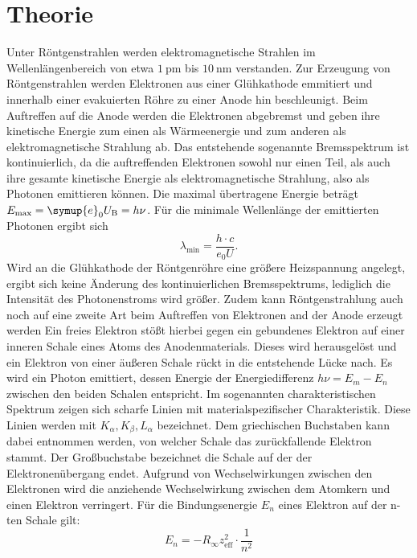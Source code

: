 \section{Theorie}
\label{sec:Theorie}
Unter Röntgenstrahlen werden elektromagnetische Strahlen im Wellenlängenbereich von etwa $\SI{1}{\pico\meter}$ bis $\SI{10}{\nano\meter}$ verstanden.
Zur Erzeugung von Röntgenstrahlen werden Elektronen aus einer Glühkathode emmitiert und innerhalb einer evakuierten Röhre zu einer Anode hin beschleunigt.
Beim Auftreffen auf die Anode werden die Elektronen abgebremst und geben ihre kinetische Energie zum einen als Wärmeenergie und zum anderen als elektromagnetische Strahlung ab.
Das entstehende sogenannte Bremsspektrum ist kontinuierlich, da die auftreffenden Elektronen sowohl nur einen Teil, als auch ihre gesamte kinetische Energie als elektromagnetische Strahlung, also als Photonen emittieren können.
Die maximal übertragene Energie beträgt $E_\mathrm{max}=\symup{e}_0U_\mathrm{B}=h\nu$.
Für die minimale Wellenlänge der emittierten Photonen ergibt sich
\begin{equation}
  \label{eqn:welle}
  \lambda_\mathrm{min}=\frac{h\cdot c}{e_0U} \text{.}
\end{equation}
Wird an die Glühkathode der Röntgenröhre eine größere Heizspannung angelegt, ergibt sich keine Änderung des kontinuierlichen Bremsspektrums, lediglich die Intensität des Photonenstroms wird größer.
Zudem kann Röntgenstrahlung auch noch auf eine zweite Art beim Auftreffen von Elektronen and der Anode erzeugt werden
Ein freies Elektron stößt hierbei gegen ein gebundenes Elektron auf einer inneren Schale eines Atoms des Anodenmaterials.
Dieses wird herausgelöst und ein Elektron von einer äußeren Schale rückt in die entstehende Lücke nach. Es wird ein Photon emittiert, dessen Energie der Energiedifferenz $h\nu=E_m-E_n$ zwischen den beiden Schalen entspricht.
Im sogenannten charakteristischen Spektrum zeigen sich scharfe Linien mit materialspezifischer Charakteristik.
Diese Linien werden mit $K_\alpha,K_\beta,L_\alpha$ bezeichnet. Dem griechischen Buchstaben kann dabei entnommen werden, von welcher Schale das zurückfallende Elektron
stammt. Der Großbuchstabe bezeichnet die Schale auf der der Elektronenübergang endet.
Aufgrund von Wechselwirkungen zwischen den Elektronen wird die anziehende Wechselwirkung zwischen dem Atomkern und einen Elektron verringert.
Für  die Bindungsenergie $E_n$ eines Elektron auf der n-ten Schale gilt:
\begin{equation}
  E_n=-R_\infty z_\mathrm{eff}^2 \cdot \frac{1}{n^2}
\end{equation}
